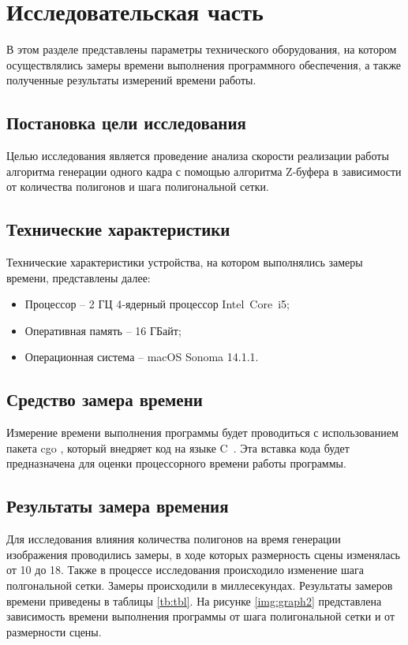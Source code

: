 \chapter{Исследовательская часть}

В этом разделе представлены параметры технического оборудования, на 
котором осуществлялись замеры времени выполнения программного обеспечения, 
а также полученные результаты измерений времени работы.

\section{Постановка цели исследования}

Целью исследования является проведение анализа скорости реализации работы алгоритма генерации одного кадра с помощью алгоритма Z-буфера в 
зависимости от количества полигонов и шага полигональной сетки.

\section{Технические характеристики}

Технические характеристики устройства, на котором выполнялись замеры времени, представлены далее:

\begin{itemize}
	\item Процессор -- 2 ГЦ 4‑ядерный процессор Intel Core i5;
	\item Оперативная память -- 16 ГБайт;
	\item Операционная система -- macOS Sonoma 14.1.1. 
\end{itemize}

\section{Средство замера времени}

Измерение времени выполнения программы будет проводиться с использованием пакета cgo \cite{cgo}, который внедряет код на языке C~\cite{c}. 
Эта вставка кода будет предназначена для оценки процессорного времени работы программы.

\section{Результаты замера времения}

Для исследования влияния количества полигонов на время генерации изображения проводились замеры, 
в ходе которых размерность сцены изменялась от 10 до 18. Также в процессе исследования происходило изменение шага 
полгональной сетки. Замеры происходили в миллесекундах. Результаты замеров времени приведены в 
таблицы \ref{tb:tbl}. На рисунке \ref{img:graph2} представлена зависимость 
времени выполнения программы от шага полигональной сетки и от размерности сцены.

